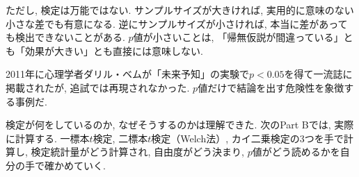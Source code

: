     ただし, 検定は万能ではない.
    サンプルサイズが大きければ, 実用的に意味のない小さな差でも有意になる.
    逆にサンプルサイズが小さければ, 本当に差があっても検出できないことがある.
    $p$値が小さいことは, 「帰無仮説が間違っている」とも「効果が大きい」とも直接には意味しない.

    2011年に心理学者ダリル・ベムが「未来予知」の実験で$p < 0.05$を得て一流誌に掲載されたが, 追試では再現されなかった.
    $p$値だけで結論を出す危険性を象徴する事例だ.

    検定が何をしているのか, なぜそうするのかは理解できた.
    次のPart Bでは, 実際に計算する.
    一標本$t$検定, 二標本$t$検定（Welch法）, カイ二乗検定の3つを手で計算し,
    検定統計量がどう計算され, 自由度がどう決まり, $p$値がどう読めるかを自分の手で確かめていく.
